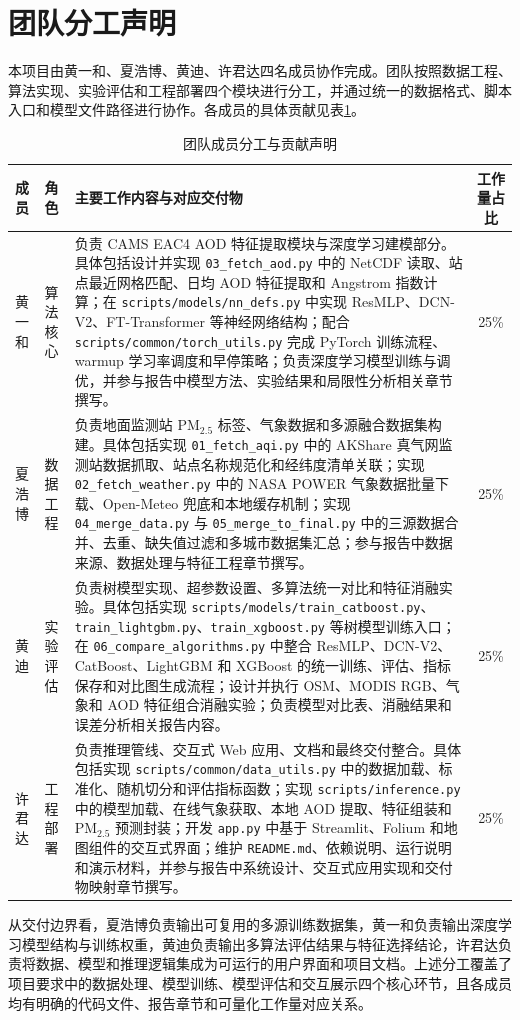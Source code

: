 ﻿\documentclass[UTF8,zihao=-4,a4paper]{ctexart}
\newcommand{\pmfine}{PM$_{2.5}$}
\newcommand{\aod}{AOD}
\begin{document}
\appendix
\section{团队分工声明}

本项目由黄一和、夏浩博、黄迪、许君达四名成员协作完成。团队按照数据工程、算法实现、实验评估和工程部署四个模块进行分工，并通过统一的数据格式、脚本入口和模型文件路径进行协作。各成员的具体贡献见表\ref{tab:team_contribution}。

\begin{table}[H]
  \centering
  \caption{团队成员分工与贡献声明}
  \label{tab:team_contribution}
  \small
  \begin{tabularx}{\textwidth}{llXc}
    \toprule
    成员 & 角色 & 主要工作内容与对应交付物 & 工作量占比 \\
    \midrule
    黄一和 & 算法核心 &
    负责 CAMS EAC4 \aod{} 特征提取模块与深度学习建模部分。具体包括设计并实现 \texttt{03\_fetch\_aod.py} 中的 NetCDF 读取、站点最近网格匹配、日均 \aod{} 特征提取和 Angstrom 指数计算；在 \texttt{scripts/models/nn\_defs.py} 中实现 ResMLP、DCN-V2、FT-Transformer 等神经网络结构；配合 \texttt{scripts/common/torch\_utils.py} 完成 PyTorch 训练流程、warmup 学习率调度和早停策略；负责深度学习模型训练与调优，并参与报告中模型方法、实验结果和局限性分析相关章节撰写。 & 25\% \\
    夏浩博 & 数据工程 &
    负责地面监测站 \pmfine{} 标签、气象数据和多源融合数据集构建。具体包括实现 \texttt{01\_fetch\_aqi.py} 中的 AKShare 真气网监测站数据抓取、站点名称规范化和经纬度清单关联；实现 \texttt{02\_fetch\_weather.py} 中的 NASA POWER 气象数据批量下载、Open-Meteo 兜底和本地缓存机制；实现 \texttt{04\_merge\_data.py} 与 \texttt{05\_merge\_to\_final.py} 中的三源数据合并、去重、缺失值过滤和多城市数据集汇总；参与报告中数据来源、数据处理与特征工程章节撰写。 & 25\% \\
    黄迪 & 实验评估 &
    负责树模型实现、超参数设置、多算法统一对比和特征消融实验。具体包括实现 \texttt{scripts/models/train\_catboost.py}、\texttt{train\_lightgbm.py}、\texttt{train\_xgboost.py} 等树模型训练入口；在 \texttt{06\_compare\_algorithms.py} 中整合 ResMLP、DCN-V2、CatBoost、LightGBM 和 XGBoost 的统一训练、评估、指标保存和对比图生成流程；设计并执行 OSM、MODIS RGB、气象和 \aod{} 特征组合消融实验；负责模型对比表、消融结果和误差分析相关报告内容。 & 25\% \\
    许君达 & 工程部署 &
    负责推理管线、交互式 Web 应用、文档和最终交付整合。具体包括实现 \texttt{scripts/common/data\_utils.py} 中的数据加载、标准化、随机切分和评估指标函数；实现 \texttt{scripts/inference.py} 中的模型加载、在线气象获取、本地 \aod{} 提取、特征组装和 \pmfine{} 预测封装；开发 \texttt{app.py} 中基于 Streamlit、Folium 和地图组件的交互式界面；维护 \texttt{README.md}、依赖说明、运行说明和演示材料，并参与报告中系统设计、交互式应用实现和交付物映射章节撰写。 & 25\% \\
    \bottomrule
  \end{tabularx}
\end{table}

从交付边界看，夏浩博负责输出可复用的多源训练数据集，黄一和负责输出深度学习模型结构与训练权重，黄迪负责输出多算法评估结果与特征选择结论，许君达负责将数据、模型和推理逻辑集成为可运行的用户界面和项目文档。上述分工覆盖了项目要求中的数据处理、模型训练、模型评估和交互展示四个核心环节，且各成员均有明确的代码文件、报告章节和可量化工作量对应关系。
\end{document}
